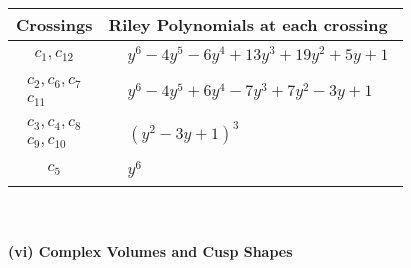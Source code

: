 \documentclass[1p]{elsarticle_modified}
\theoremstyle{definition}
\begin{document}
\begin{tabular}{m{50pt}|m{274pt}}
Crossings & \hspace{64pt}Riley Polynomials at each crossing \\
\hline $$\begin{aligned}c_{1},c_{12}\end{aligned}$$&$\begin{aligned}
&y^6-4 y^5-6 y^4+13 y^3+19 y^2+5 y+1
\end{aligned}$\\
\hline $$\begin{aligned}c_{2},c_{6},c_{7}\\c_{11}\end{aligned}$$&$\begin{aligned}
&y^6-4 y^5+6 y^4-7 y^3+7 y^2-3 y+1
\end{aligned}$\\
\hline $$\begin{aligned}c_{3},c_{4},c_{8}\\c_{9},c_{10}\end{aligned}$$&$\begin{aligned}
&(y^2-3 y+1)^3
\end{aligned}$\\
\hline $$\begin{aligned}c_{5}\end{aligned}$$&$\begin{aligned}
&y^6
\end{aligned}$\\
\hline
\end{tabular}\\~\\
\newpage\flushleft \textbf{(vi) Complex Volumes and Cusp Shapes}
\end{document}

